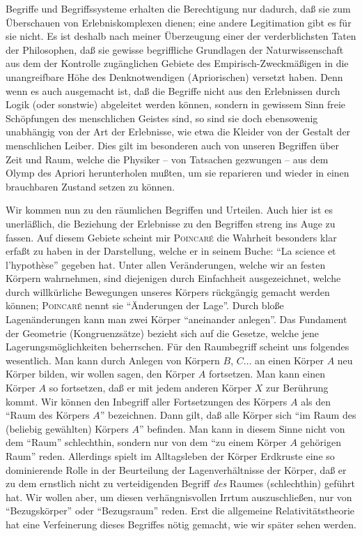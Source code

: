 
Begriffe und Begriffssysteme erhalten die Berechtigung nur dadurch, daß sie zum 
Überschauen von Erlebniskomplexen dienen; eine andere Legitimation gibt es für 
sie nicht. Es ist deshalb nach meiner Überzeugung einer der verderblichsten 
Taten der Philosophen, daß sie gewisse begriffliche Grundlagen der 
Naturwissenschaft aus dem der Kontrolle zugänglichen Gebiete des 
Empirisch-Zweckmäßigen in die unangreifbare Höhe des Denknotwendigen 
(Apriorischen) versetzt haben. Denn wenn es auch ausgemacht ist, daß die 
Begriffe nicht aus den Erlebnissen durch Logik (oder sonstwie) abgeleitet werden 
können, sondern in gewissem Sinn freie Schöpfungen des menschlichen Geistes 
sind, so sind sie doch ebensowenig unabhängig von der Art der Erlebnisse, wie 
etwa die Kleider von der Gestalt der menschlichen Leiber. Dies gilt im 
besonderen auch von unseren Begriffen über Zeit und Raum, welche die Physiker -- 
von Tatsachen gezwungen -- aus dem Olymp des Apriori herunterholen mußten, um 
sie reparieren und wieder in einen brauchbaren Zustand setzen zu können.

Wir kommen nun zu den räumlichen Begriffen und Urteilen. Auch hier ist es 
unerläßlich, die Beziehung der Erlebnisse zu den Begriffen streng ins Auge zu 
fassen. Auf diesem Gebiete scheint mir 
\textsc{Poincar\'e} die Wahrheit besonders klar 
erfaßt zu haben in der Darstellung, welche er in seinem Buche: \enquote{La 
science et l'hypothèse} gegeben hat. Unter allen Veränderungen, welche wir an 
festen Körpern wahrnehmen, sind diejenigen durch Einfachheit ausgezeichnet, 
welche durch willkürliche Bewegungen unseres Körpers rückgängig gemacht werden 
können; \textsc{Poincar\'e} nennt sie 
\enquote{Änderungen der Lage}. Durch bloße Lagenänderungen kann man zwei Körper 
\enquote{aneinander anlegen}. Das Fundament der Geometrie (Kongruenzsätze) 
bezieht sich auf die Gesetze, welche jene Lagerungsmöglichkeiten beherrschen. 
Für den Raumbegriff scheint uns folgendes wesentlich. Man kann durch Anlegen von 
Körpern $B$, $C \ldots$ an einen Körper $A$ neu Körper bilden, wir wollen sagen, 
den Körper $A$ fortsetzen. Man kann einen Körper $A$ so fortsetzen, daß er mit 
jedem anderen Körper $X$ zur Berührung kommt. Wir können den Inbegriff aller 
Fortsetzungen des Körpers $A$ als den \enquote{Raum des Körpers $A$} bezeichnen. 
Dann gilt, daß alle Körper sich \enquote{im Raum des (beliebig gewählten) 
Körpers $A$} befinden. Man kann in diesem Sinne nicht von dem \enquote{Raum} 
schlechthin, sondern nur von dem \enquote{zu einem Körper $A$ gehörigen Raum} 
reden. Allerdings spielt im Alltagsleben der Körper Erdkruste eine so 
dominierende Rolle in der Beurteilung der Lagenverhältnisse der Körper, daß er 
zu dem ernstlich nicht zu verteidigenden Begriff \emph{des} Raumes (schlechthin) 
geführt hat. Wir wollen aber, um diesen verhängnisvollen Irrtum auszuschließen, 
nur von \enquote{Bezugskörper} oder \enquote{Bezugsraum} reden. Erst die 
allgemeine Relativitätstheorie hat eine Verfeinerung dieses Begriffes nötig 
gemacht, wie wir später sehen werden.

